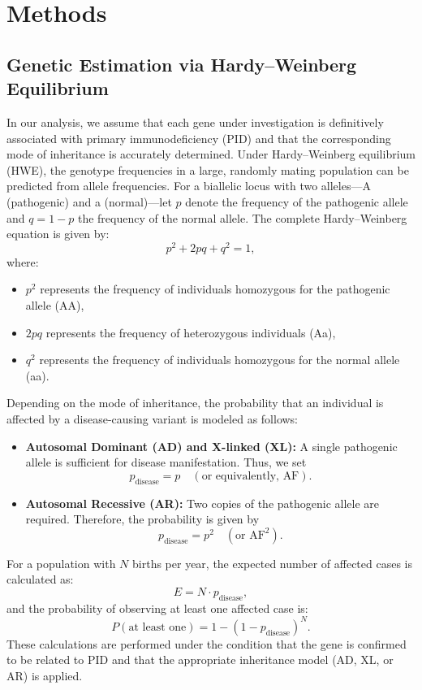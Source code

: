 \section{Methods}
\subsection{Genetic Estimation via Hardy–Weinberg Equilibrium}
In our analysis, we assume that each gene under investigation is definitively associated with primary immunodeficiency (PID) and that the corresponding mode of inheritance is accurately determined. Under Hardy–Weinberg equilibrium (HWE), the genotype frequencies in a large, randomly mating population can be predicted from allele frequencies. For a biallelic locus with two alleles—A (pathogenic) and a (normal)—let \(p\) denote the frequency of the pathogenic allele and \(q = 1-p\) the frequency of the normal allele. The complete Hardy–Weinberg equation is given by:
\[
p^2 + 2pq + q^2 = 1,
\]
where:
\begin{itemize}
    \item \(p^2\) represents the frequency of individuals homozygous for the pathogenic allele (AA),
    \item \(2pq\) represents the frequency of heterozygous individuals (Aa),
    \item \(q^2\) represents the frequency of individuals homozygous for the normal allele (aa).
\end{itemize}

Depending on the mode of inheritance, the probability that an individual is affected by a disease-causing variant is modeled as follows:
\begin{itemize}
    \item \textbf{Autosomal Dominant (AD) and X-linked (XL):} A single pathogenic allele is sufficient for disease manifestation. Thus, we set
    \[
    p_{\text{disease}} = p \quad (\text{or equivalently, } \text{AF}).
    \]
    \item \textbf{Autosomal Recessive (AR):} Two copies of the pathogenic allele are required. Therefore, the probability is given by
    \[
    p_{\text{disease}} = p^2 \quad (\text{or } \text{AF}^2).
    \]
\end{itemize}

For a population with \(N\) births per year, the expected number of affected cases is calculated as:
\[
E = N \cdot p_{\text{disease}},
\]
and the probability of observing at least one affected case is:
\[
P(\text{at least one}) = 1 - (1 - p_{\text{disease}})^N.
\]
These calculations are performed under the condition that the gene is confirmed to be related to PID and that the appropriate inheritance model (AD, XL, or AR) is applied.

